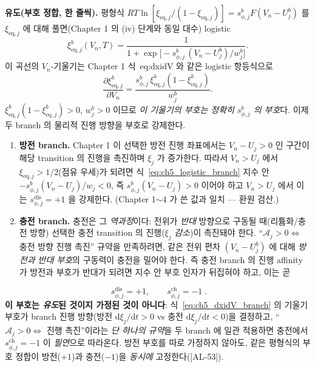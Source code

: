 \documentclass[11pt,a4paper]{article}
\newcommand{\dd}{\mathrm{d}}
\newcommand{\eq}{\mathrm{eq}}
\newcommand{\dis}{\mathrm{dis}}
\newcommand{\chg}{\mathrm{ch}}
\newcommand{\AL}[1]{\textsf{[AL-#1]}}
\begin{document}
\textbf{유도(부호 정합, 한 줄씩).} 평형식 $RT\ln[\xi_{\eq,j}/(1-\xi_{\eq,j})]=s_{\phi,j}^b F(V_n-U_j^b)$ 를
$\xi_{\eq,j}$ 에 대해 풀면(Chapter 1 의 (iv) 단계와 동일 대수) logistic
\begin{equation}
\xi_{\eq,j}^b(V_n,T)=\frac{1}{1+\exp\!\big[-s_{\phi,j}^b\,(V_n-U_j^b)/w_j^b\big]}.
\label{eq:ch5_logistic_branch}
\end{equation}
이 곡선의 $V_n$-기울기는 Chapter 1 식~eq:dxidV 와 같은 logistic 항등식으로
\begin{equation}
\frac{\partial\xi_{\eq,j}^b}{\partial V_n}=\frac{s_{\phi,j}^b\,\xi_{\eq,j}^b(1-\xi_{\eq,j}^b)}{w_j^b}.
\label{eq:ch5_dxidV_branch}
\end{equation}
$\xi_{\eq,j}^b(1-\xi_{\eq,j}^b)>0$, $w_j^b>0$ 이므로 \emph{이 기울기의 부호는 정확히 $s_{\phi,j}^b$ 의 부호}다.
이제 두 branch 의 물리적 진행 방향을 부호로 강제한다.
\begin{enumerate}[label=(\roman*),leftmargin=2.2em]
\item \textbf{방전 branch.} Chapter 1 이 선택한 방전 진행 좌표에서는 $V_n-U_j>0$ 인 구간이 해당 transition 의
  진행을 촉진하며 $\xi_j$ 가 증가한다. 따라서 $V_n>U_j$ 에서 $\xi_{\eq,j}>1/2$(점유 우세)가 되려면
  식~\eqref{eq:ch5_logistic_branch} 지수 안 $-s_{\phi,j}^b(V_n-U_j)/w_j<0$, 즉 $s_{\phi,j}^b(V_n-U_j)>0$ 이어야
  하고 $V_n>U_j$ 에서 이는 $s_{\phi,j}^\dis=+1$ 을 강제한다. (Chapter 1$\sim$4 가 쓴 값과 일치 — 환원 검산.)
\item \textbf{충전 branch.} 충전은 그 \emph{역과정}이다: 전위가 \emph{반대} 방향으로 구동될 때(리튬화/충전
  방향) 선택한 충전 transition 의 진행($\xi_j$ \emph{감소})이 촉진돼야 한다. ``$\mathcal A_j>0\Leftrightarrow$
  충전 방향 진행 촉진'' 규약을 만족하려면, 같은 전위 편차 $(V_n-U_j^b)$ 에 대해 \emph{방전과 반대 부호}의
  구동력이 충전을 밀어야 한다. 즉 충전 branch 의 진행 affinity 가 방전과 부호가 반대가 되려면 지수 안 부호
  인자가 뒤집혀야 하고, 이는 곧
\end{enumerate}
\begin{equation}
\boxed{\;s_{\phi,j}^\dis=+1,\qquad s_{\phi,j}^\chg=-1\;.}
\label{eq:ch5_schg}
\end{equation}
\textbf{이 부호는 \emph{유도}된 것이지 가정된 것이 아니다}: 식~\eqref{eq:ch5_dxidV_branch} 의 기울기 부호가
branch 진행 방향(방전 $\dd\xi_j/\dd t>0$ vs 충전 $\dd\xi_j/\dd t<0$)을 결정하고, ``$\mathcal A_j>0\Leftrightarrow$
진행 촉진''이라는 \emph{단 하나의 규약}을 두 branch 에 일관 적용하면 충전에서 $s_{\phi,j}^\chg=-1$ 이
\emph{필연}으로 따라온다. 방전 부호를 따로 가정하지 않아도, 같은 평형식의 부호 정합이 방전($+1$)과 충전($-1$)을
\emph{동시에} 고정한다(\AL{53}).
\end{document}
